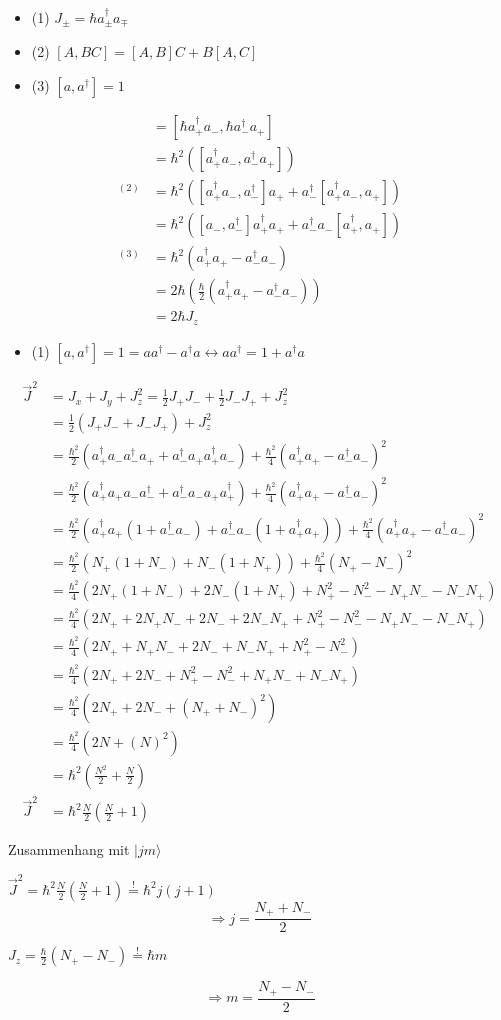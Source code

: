 \begin{itemize}
\item (1) \(J_\pm = \hbar a^\dagger_\pm a_\mp\)
\item (2) \([A,BC]=[A,B]C+B[A,C]\)
\item (3) \([a,a^\dagger]=1\)
\end{itemize}

\begin{align}
[J_+,J_-]&=[\hbar a^\dagger_+ a_-,\hbar a^\dagger_- a_+] \\
&=\hbar^2([a^\dagger_+ a_-,a^\dagger_- a_+]) \\
^{(2)}&=\hbar^2([a^\dagger_+ a_-,a^\dagger_-] a_+ +a^\dagger_- [a^\dagger_+ a_-, a_+]) \\
&=\hbar^2([a_-,a^\dagger_-]a^\dagger_+a_+ +a^\dagger_-a_-[a^\dagger_+, a_+]) \\
^{(3)}&=\hbar^2(a^\dagger_+a_+ - a^\dagger_-a_-) \\
&=2\hbar(\frac{\hbar}{2}(a^\dagger_+a_+ - a^\dagger_-a_-)) \\
&=2\hbar J_z
\end{align}


\begin{itemize}
\item (1) \([a,a^\dagger]=1=aa^\dagger-a^\dagger a \leftrightarrow aa^\dagger=1+a^\dagger a\)
\end{itemize}


\begin{align} \vec J^2 &= J_x+J_y+J^2_z = \frac{1}{2}J_+J_-+  \frac{1}{2}J_-J_+ + J^2_z \\
&= \frac{1}{2}(J_+J_-+ J_-J_+) + J^2_z\\
&= \frac{\hbar^2}{2}(a^\dagger_+a_-a^\dagger_-a_+ + a^\dagger_-a_+a^\dagger_+a_-)+ \frac{\hbar^2}{4}( a^\dagger_+ a_+-a^\dagger_- a_-)^2 \\
&= \frac{\hbar^2}{2}(a^\dagger_+a_+a_-a^\dagger_- + a^\dagger_-a_-a_+a^\dagger_+)+ \frac{\hbar^2}{4}( a^\dagger_+ a_+-a^\dagger_- a_-)^2 \\
&= \frac{\hbar^2}{2}(a^\dagger_+a_+(1+a^\dagger_-a_-) + a^\dagger_-a_-(1+a^\dagger_+a_+))+ \frac{\hbar^2}{4}( a^\dagger_+ a_+-a^\dagger_- a_-)^2 \\
&= \frac{\hbar^2}{2}(N_+(1+N_-) + N_-(1+N_+))+ \frac{\hbar^2}{4}( N_+-N_-)^2 \\
&= \frac{\hbar^2}{4}(2N_+(1+N_-) + 2N_-(1+N_+) + N^2_+-N^2_--N_+N_--N_-N_+) \\
&= \frac{\hbar^2}{4}(2N_++2N_+N_- + 2N_-+2N_-N_+ + N^2_+-N^2_--N_+N_--N_-N_+) \\
&= \frac{\hbar^2}{4}(2N_++N_+N_- + 2N_-+N_-N_+ + N^2_+-N^2_-) \\
&= \frac{\hbar^2}{4}(2N_++  2N_- + N^2_+-N^2_- + N_+N_- +N_-N_+ ) \\
&= \frac{\hbar^2}{4}(2N_++  2N_- + (N_++N_-)^2) \\
&= \frac{\hbar^2}{4}(2N + (N)^2) \\
&= \hbar^2(\frac{N^2}{2} + \frac{N}{2} ) \\
\vec J^2 &= \hbar^2 \frac{N}{2}(\frac{N}{2}+1)
\end{align}



Zusammenhang mit \(|jm\rangle\)

\(\vec J^2 = \hbar^2 \frac{N}{2}(\frac{N}{2}+1) \stackrel{\mathrm{!}}=\hbar^2 j(j+1)\)
\[ \Rightarrow j=\frac{N_++N_-}{2} \]

\(J_z=\frac{\hbar}{2}(N_+-N_-)  \stackrel{\mathrm{!}}= \hbar m \)

\[ \Rightarrow m=\frac{N_+-N_-}{2} \]


